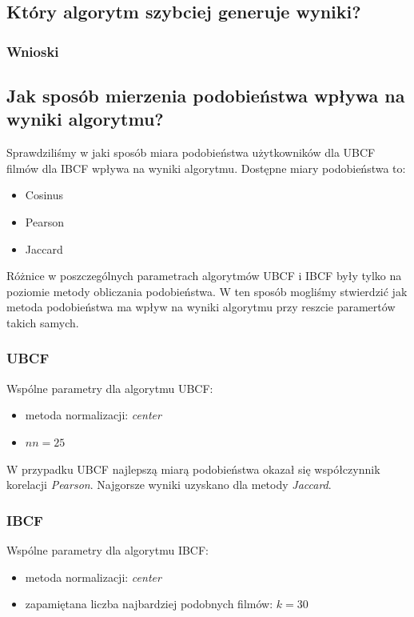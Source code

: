 \documentclass[12pt, a4paper]{article}
\begin{document}
\subsection{Który algorytm szybciej generuje wyniki?}

\subsubsection{Wnioski}

\subsection{Jak sposób mierzenia podobieństwa wpływa na wyniki algorytmu?}
Sprawdziliśmy w jaki sposób miara podobieństwa użytkowników dla UBCF filmów dla IBCF wpływa na wyniki algorytmu.
Dostępne miary podobieństwa to:
\begin{itemize}
\item Cosinus
\item Pearson
\item Jaccard
\end{itemize}

Różnice w poszczególnych parametrach algorytmów UBCF i IBCF były tylko na poziomie metody obliczania podobieństwa. W ten sposób mogliśmy stwierdzić jak metoda podobieństwa ma wpływ na wyniki algorytmu przy reszcie paramertów takich samych. 

\subsubsection{UBCF}
Wspólne parametry dla algorytmu UBCF:
\begin{itemize}
\item metoda normalizacji: \emph{center}
\item $nn = 25$
\end{itemize}

W przypadku UBCF najlepszą miarą podobieństwa okazał się współczynnik korelacji \emph{Pearson}. Najgorsze wyniki uzyskano dla metody \emph{Jaccard}.



\subsubsection{IBCF}
Wspólne parametry dla algorytmu IBCF:
\begin{itemize}
\item metoda normalizacji: \emph{center}
\item zapamiętana liczba najbardziej podobnych filmów: $k = 30$
\end{itemize}
\end{document}
